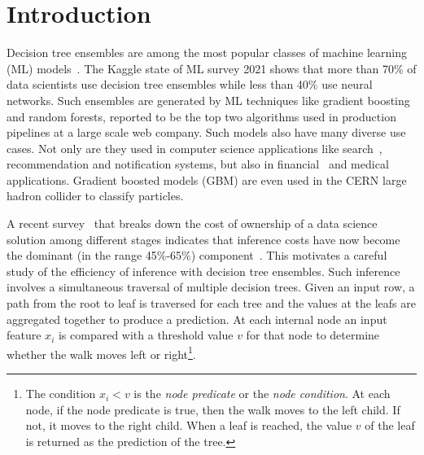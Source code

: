 \section{Introduction}
\label{sec:intro}
Decision tree ensembles are among the most popular classes of machine learning (ML) models~\cite{KaggleSurvey,LookingGlass}. The Kaggle state of ML survey 2021 \cite{KaggleSurvey} shows that 
more than 70\% of data scientists use decision tree ensembles while less than 40\% use neural networks. 
Such ensembles are generated by ML techniques like gradient boosting and random forests, reported to be the top
two algorithms used in production pipelines at a large scale web company\cite{LookingGlass}. Such models also 
have many diverse use cases\cite{DecisionTreesOverview}. Not only are they used in computer science applications 
like search~\cite{YahooSearch}, recommendation and notification systems\cite{Facebook}, but also in 
financial~\cite{Finance} and medical~\cite{Med1, Med2} applications. Gradient boosted models (GBM) are
even used in the CERN large hadron collider to classify particles\cite{LHCModel}. 


A recent survey~\cite{SageMaker} that breaks down the cost of ownership of a
data science solution among different stages indicates that inference costs
have now become the dominant (in the range 45\%-65\%) component~\cite{Hummingbird}. This motivates
a careful study of the efficiency of inference with decision tree ensembles.
Such inference involves a simultaneous traversal of multiple decision trees.
Given an input row, a path from the root to leaf is traversed for each tree and
the values at the leafs are aggregated together to produce a prediction.  At
each internal node an input feature $x_i$ is compared with a threshold value $v$ for that node
to determine whether the walk moves left or right\footnote{  
The condition $x_i<v$ is the \emph{node predicate} or the \emph{node condition}.
At each node, if the node predicate is true, then
the walk moves to the left child. If not, it moves to the right child. When a leaf is reached,
the value $v$ of the leaf is returned as the prediction of the tree.}.
 
